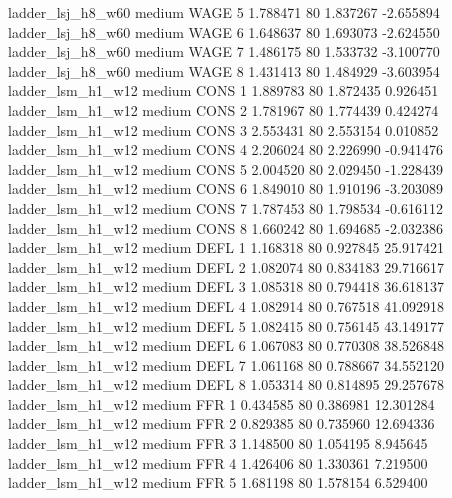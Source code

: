   ladder_lsj_h8_w60     medium     WAGE                 5  1.788471 80       1.837267          -2.655894
  ladder_lsj_h8_w60     medium     WAGE                 6  1.648637 80       1.693073          -2.624550
  ladder_lsj_h8_w60     medium     WAGE                 7  1.486175 80       1.533732          -3.100770
  ladder_lsj_h8_w60     medium     WAGE                 8  1.431413 80       1.484929          -3.603954
  ladder_lsm_h1_w12     medium     CONS                 1  1.889783 80       1.872435           0.926451
  ladder_lsm_h1_w12     medium     CONS                 2  1.781967 80       1.774439           0.424274
  ladder_lsm_h1_w12     medium     CONS                 3  2.553431 80       2.553154           0.010852
  ladder_lsm_h1_w12     medium     CONS                 4  2.206024 80       2.226990          -0.941476
  ladder_lsm_h1_w12     medium     CONS                 5  2.004520 80       2.029450          -1.228439
  ladder_lsm_h1_w12     medium     CONS                 6  1.849010 80       1.910196          -3.203089
  ladder_lsm_h1_w12     medium     CONS                 7  1.787453 80       1.798534          -0.616112
  ladder_lsm_h1_w12     medium     CONS                 8  1.660242 80       1.694685          -2.032386
  ladder_lsm_h1_w12     medium     DEFL                 1  1.168318 80       0.927845          25.917421
  ladder_lsm_h1_w12     medium     DEFL                 2  1.082074 80       0.834183          29.716617
  ladder_lsm_h1_w12     medium     DEFL                 3  1.085318 80       0.794418          36.618137
  ladder_lsm_h1_w12     medium     DEFL                 4  1.082914 80       0.767518          41.092918
  ladder_lsm_h1_w12     medium     DEFL                 5  1.082415 80       0.756145          43.149177
  ladder_lsm_h1_w12     medium     DEFL                 6  1.067083 80       0.770308          38.526848
  ladder_lsm_h1_w12     medium     DEFL                 7  1.061168 80       0.788667          34.552120
  ladder_lsm_h1_w12     medium     DEFL                 8  1.053314 80       0.814895          29.257678
  ladder_lsm_h1_w12     medium      FFR                 1  0.434585 80       0.386981          12.301284
  ladder_lsm_h1_w12     medium      FFR                 2  0.829385 80       0.735960          12.694336
  ladder_lsm_h1_w12     medium      FFR                 3  1.148500 80       1.054195           8.945645
  ladder_lsm_h1_w12     medium      FFR                 4  1.426406 80       1.330361           7.219500
  ladder_lsm_h1_w12     medium      FFR                 5  1.681198 80       1.578154           6.529400
